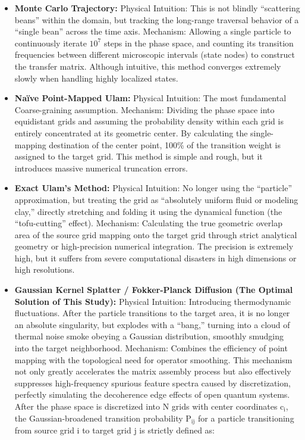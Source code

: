 \begin{itemize}
\item
  \textbf{Monte Carlo Trajectory:} Physical Intuition: This is not
  blindly ``scattering beans'' within the domain, but tracking the
  long-range traversal behavior of a ``single bean'' across the time
  axis. Mechanism: Allowing a single particle to continuously iterate
  \(\text{10}^{\text{7}}\) steps in the phase space, and counting its
  transition frequencies between different microscopic intervals (state
  nodes) to construct the transfer matrix. Although intuitive, this
  method converges extremely slowly when handling highly localized
  states.
\item
  \textbf{Naïve Point-Mapped Ulam:} Physical Intuition: The most
  fundamental Coarse-graining assumption. Mechanism: Dividing the phase
  space into equidistant grids and assuming the probability density
  within each grid is entirely concentrated at its geometric center. By
  calculating the single-mapping destination of the center point, 100\%
  of the transition weight is assigned to the target grid. This method
  is simple and rough, but it introduces massive numerical truncation
  errors.
\item
  \textbf{Exact Ulam's Method:} Physical Intuition: No longer using the
  ``particle'' approximation, but treating the grid as ``absolutely
  uniform fluid or modeling clay,'' directly stretching and folding it
  using the dynamical function (the ``tofu-cutting'' effect). Mechanism:
  Calculating the true geometric overlap area of the source grid mapping
  onto the target grid through strict analytical geometry or
  high-precision numerical integration. The precision is extremely high,
  but it suffers from severe computational disasters in high dimensions
  or high resolutions.
\item
  \textbf{Gaussian Kernel Splatter / Fokker-Planck Diffusion (The
  Optimal Solution of This Study):} Physical Intuition: Introducing
  thermodynamic fluctuations. After the particle transitions to the
  target area, it is no longer an absolute singularity, but explodes
  with a ``bang,'' turning into a cloud of thermal noise smoke obeying a
  Gaussian distribution, smoothly smudging into the target neighborhood.
  Mechanism: Combines the efficiency of point mapping with the
  topological need for operator smoothing. This mechanism not only
  greatly accelerates the matrix assembly process but also effectively
  suppresses high-frequency spurious feature spectra caused by
  discretization, perfectly simulating the decoherence edge effects of
  open quantum systems. After the phase space is discretized into
  \(\text{N}\) grids with center coordinates \(\text{c}_{\text{i}}\),
  the Gaussian-broadened transition probability \(\text{P}_{\text{ij}}\)
  for a particle transitioning from source grid \(\text{i}\) to target
  grid \(\text{j}\) is strictly defined as:
\end{itemize}

